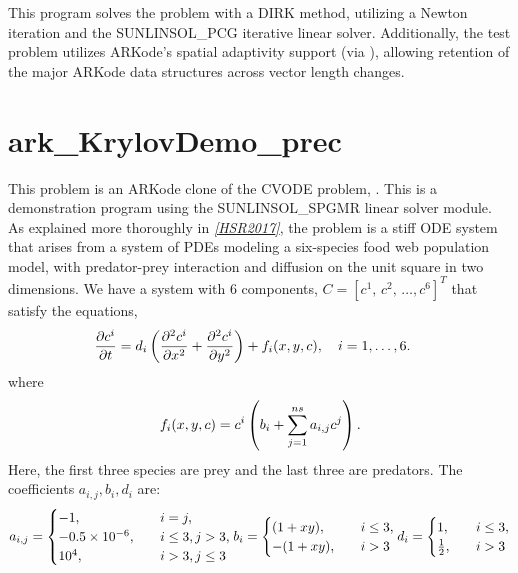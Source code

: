 \documentclass[letterpaper,10pt,english]{sphinxmanual}
\begin{document}
This program solves the problem with a DIRK method, utilizing a Newton
iteration and the SUNLINSOL\_PCG iterative linear solver.
Additionally, the test problem utilizes ARKode's spatial adaptivity
support (via ), allowing retention of the
major ARKode data structures across vector length changes.


\section{ark\_KrylovDemo\_prec}
\label{c_serial:ark-krylovdemo-prec}\label{c_serial:id30}
This problem is an ARKode clone of the CVODE problem,
.  This is a demonstration program using the
SUNLINSOL\_SPGMR linear solver module.  As explained more thoroughly in
\label{c_serial:id31}{\hyperref[References:hsr2017]{\emph{{[}HSR2017{]}}}}, the problem is a stiff ODE system that arises from a
system of PDEs modeling a six-species food web population model, with
predator-prey interaction and diffusion on the unit square in two
dimensions.  We have a system with 6 components, \(C = [c^1,\,
c^2,\,\ldots, c^6]^T\) that satisfy the equations,
\begin{gather}
\begin{split}\frac{\partial c^i}{\partial t} &= d_i \left(\frac{\partial^2 c^i}{\partial
   x^2} + \frac{\partial^2 c^i}{\partial y^2}\right) +
   f_i(x,y,c),\quad i=1,\ldots,6.\end{split}\notag
\end{gather}
where
\begin{gather}
\begin{split}f_i(x,y,c) = c^i\left( b_i + \sum_{j=1}^{ns} a_{i,j} c^j\right).\end{split}\notag
\end{gather}
Here, the first three species are prey and the last three are
predators.  The coefficients \(a_{i,j}, b_i, d_i\) are:
\begin{gather}
\begin{split}a_{i,j} = \begin{cases}
            -1, \quad & i=j,\\
            -0.5\times10^{-6}, \quad & i\le 3, j>3, \\
             10^4, \quad & i>3, j\le3
          \end{cases}
b_i = \begin{cases}
         (1+xy), \quad & i\le 3,\\
        -(1+xy), \quad & i>3
      \end{cases}
d_i = \begin{cases}
         1, \quad & i\le 3,\\
         \frac12, \quad & i>3
      \end{cases}\end{split}\notag
\end{gather}
\end{document}
